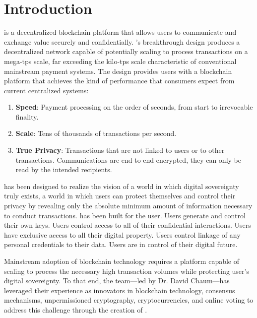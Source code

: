 \section{Introduction}

\name is a decentralized blockchain platform that allows users to communicate and exchange value securely and confidentially. \name's breakthrough design produces a decentralized network capable of potentially scaling to process transactions on a mega-tps scale, far exceeding the kilo-tps scale characteristic of conventional mainstream payment systems. The \name design provides users with a blockchain platform that achieves the kind of performance that consumers expect from current centralized systems:

\begin{enumerate}
    \item \textbf{Speed}: Payment processing on the order of seconds, from start to irrevocable finality.
    \item \textbf{Scale}: Tens of thousands of transactions per second.
    \item \textbf{True Privacy}: Transactions that are not linked to users or to other transactions. Communications are end-to-end encrypted, they can only be read by the intended recipients.
\end{enumerate}

\name has been designed to realize the vision of a world in which digital sovereignty truly exists, a world in which users can protect themselves and control their privacy by revealing only the absolute minimum amount of information necessary to conduct transactions. \name has been built for the user. Users generate and control their own keys. Users control access to all of their confidential interactions. Users have exclusive access to all their digital property. Users control linkage of any personal credentials to their data. Users are in control of their digital future.

Mainstream adoption of blockchain technology requires a platform capable of scaling to process the necessary high transaction volumes while protecting user's digital sovereignty. To that end, the \name team---led by Dr. David Chaum---has leveraged their experience as innovators in  blockchain technology, consensus mechanisms, unpermissioned cryptography, cryptocurrencies, and online voting to address this challenge through the creation of \name.

